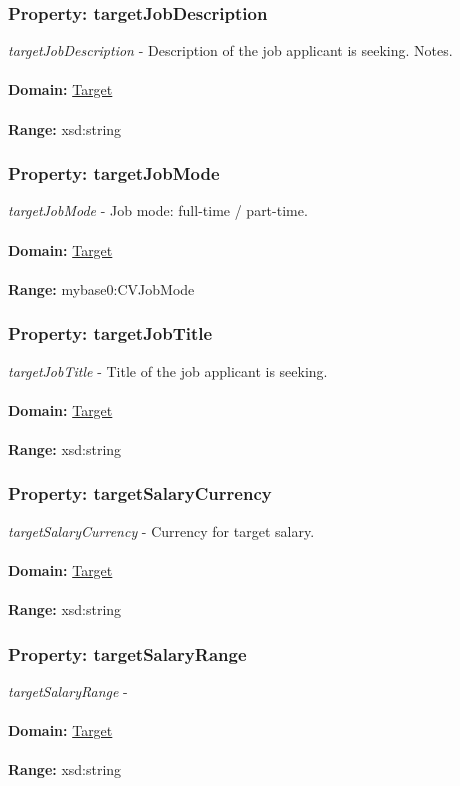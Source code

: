 \documentclass[a4paper,12pt]{article}
\numberwithin{equation}{section}
\begin{document}
\subsubsection{Property: targetJobDescription}\hypertarget{targetJobDescription}{}
\textit{targetJobDescription} - Description of the job applicant is seeking. Notes.
\\\\
\textbf{Domain:} \hyperlink{Target}{Target} 
\\\\
\textbf{Range:}  xsd:string

\subsubsection{Property: targetJobMode}\hypertarget{targetJobMode}{}
\textit{targetJobMode} - Job mode: full-time / part-time.
\\\\
\textbf{Domain:} \hyperlink{Target}{Target} 
\\\\
\textbf{Range:}  mybase0:CVJobMode

\subsubsection{Property: targetJobTitle}\hypertarget{targetJobTitle}{}
\textit{targetJobTitle} - Title of the job applicant is seeking.
\\\\
\textbf{Domain:} \hyperlink{Target}{Target} 
\\\\
\textbf{Range:}  xsd:string

\subsubsection{Property: targetSalaryCurrency}\hypertarget{targetSalaryCurrency}{}
\textit{targetSalaryCurrency} - Currency for target salary.
\\\\
\textbf{Domain:} \hyperlink{Target}{Target} 
\\\\
\textbf{Range:}  xsd:string

\subsubsection{Property: targetSalaryRange}\hypertarget{targetSalaryRange}{}
\textit{targetSalaryRange} - 
\\\\
\textbf{Domain:} \hyperlink{Target}{Target} 
\\\\
\textbf{Range:}  xsd:string
\end{document}
